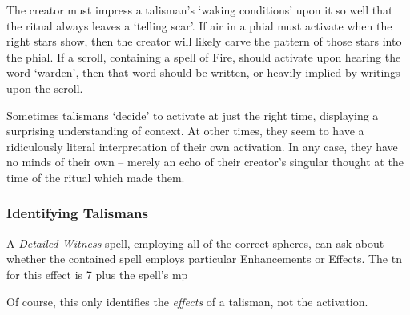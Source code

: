 \begin{multicols}{2}
The creator must impress a talisman's `waking conditions' upon it so well that the ritual always leaves a `telling scar'.
If air in a phial must activate when the right stars show, then the creator will likely carve the pattern of those stars into the phial.
If a scroll, containing a spell of Fire, should activate upon hearing the word `warden', then that word should be written, or heavily implied by writings upon the scroll.

Sometimes talismans `decide' to activate at just the right time, displaying a surprising understanding of context.
At other times, they seem to have a ridiculously literal interpretation of their own activation.
In any case, they have no minds of their own -- merely an echo of their creator's singular thought at the time of the ritual which made them.

\subsubsection{Identifying Talismans}

A \textit{Detailed Witness} spell, employing all of the correct spheres, can ask about whether the contained spell employs particular Enhancements or Effects.
The \gls{tn} for this effect is 7 plus the spell's \gls{mp}

Of course, this only identifies the \emph{effects} of a talisman, not the activation.

\end{multicols}


